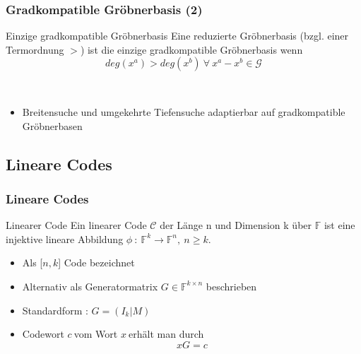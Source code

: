 \documentclass{beamer}
\begin{document}

\begin{frame}
\frametitle{Gradkompatible Gröbnerbasis (2)}


\begin{block}{Einzige gradkompatible Gröbnerbasis}
Eine reduzierte Gröbnerbasis (bzgl. einer Termordnung $>$) ist die einzige gradkompatible Gröbnerbasis wenn 
\[ deg(x^{a}) > deg(x^{b})~ \forall~ x^{a}-x^{b}\in \mathcal{G} \] 

\end{block}
~\\
\begin{itemize}
\item Breitensuche und umgekehrte Tiefensuche adaptierbar auf gradkompatible Gröbnerbasen
\end{itemize}

\end{frame}


\subsection{Lineare Codes}

\begin{frame}
\frametitle{Lineare Codes}


\begin{block}{Linearer Code}
Ein linearer Code $\mathcal{C}$  der Länge n und Dimension k über $\mathbb{F}$ ist eine injektive lineare Abbildung  $\phi~:~\mathbb{F}^{k} \rightarrow \mathbb{F}^{n},~n\geq k $.
\end{block}

\begin{itemize}
\item Als [$n,k$] Code bezeichnet
\item Alternativ als Generatormatrix $G \in \mathbb{F}^{k \times n}$ beschrieben 
~\\
\item Standardform : $G = (I_{k}| M)$ %
\item Codewort $c~$vom Wort $x~$erhält man durch 
\[
     xG = c 
 \]
\end{itemize}

\end{frame}
\end{document}
